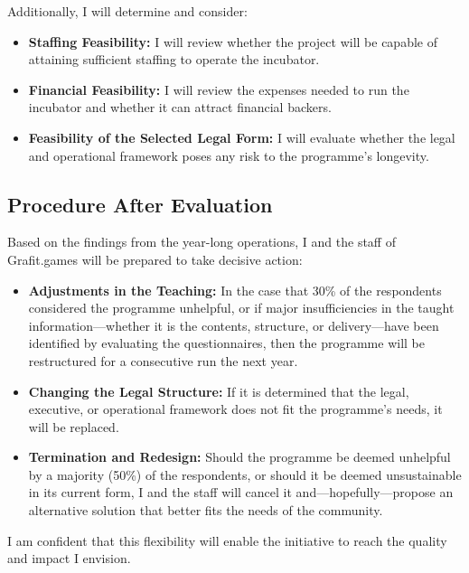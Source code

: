 Additionally, I will determine and consider:
\begin{itemize}
    \item \textbf{Staffing Feasibility:} I will review whether the project will be capable of attaining sufficient staffing to operate the incubator.
    \item \textbf{Financial Feasibility:} I will review the expenses needed to run the incubator and whether it can attract financial backers.
    \item \textbf{Feasibility of the Selected Legal Form:} I will evaluate whether the legal and operational framework poses any risk to the programme’s longevity.
\end{itemize}

\subsection{Procedure After Evaluation}
Based on the findings from the year-long operations, I and the staff of Grafit.games will be prepared to take decisive action:
\begin{itemize}
    \item \textbf{Adjustments in the Teaching:} In the case that 30\% of the respondents considered the programme unhelpful, or if major insufficiencies in the taught information---whether it is the contents, structure, or delivery---have been identified by evaluating the questionnaires, then the programme will be restructured for a consecutive run the next year.
    \item \textbf{Changing the Legal Structure:} If it is determined that the legal, executive, or operational framework does not fit the programme’s needs, it will be replaced.
    \item \textbf{Termination and Redesign:} Should the programme be deemed unhelpful by a majority (50\%) of the respondents, or should it be deemed unsustainable in its current form, I and the staff will cancel it and---hopefully---propose an alternative solution that better fits the needs of the community.
\end{itemize}

I am confident that this flexibility will enable the initiative to reach the quality and impact I envision.
